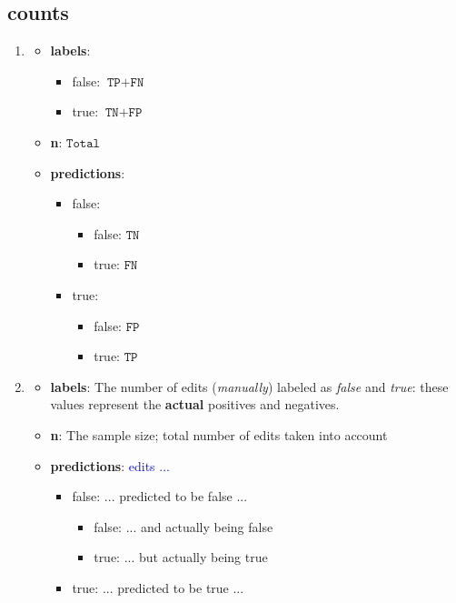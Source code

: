 \documentclass[12pt,a4paper]{article}
\begin{document}
\subsection{counts}
\begin{enumerate}
\item \begin{itemize}
\item \textbf{labels}:
\begin{itemize}
\item false: $\texttt{TP}+\texttt{FN}$
\item true: $\texttt{TN}+\texttt{FP}$
\end{itemize}
\item \textbf{n}: $\texttt{Total}$
\item \textbf{predictions}:
\begin{itemize}
\item false:
\begin{itemize}
\item false: $\texttt{TN}$
\item true: $\texttt{FN}$
\end{itemize}
\item true:
\begin{itemize}
\item false: $\texttt{FP}$
\item true: $\texttt{TP}$
\end{itemize}
\end{itemize}
\end{itemize}
\item \begin{itemize}
\item \textbf{labels}: The number of edits (\textit{manually}) labeled as \textit{false} and \textit{true}: these values represent the \textbf{actual} positives and negatives.
\item \textbf{n}: The sample size; total number of edits taken into account
\item \textbf{predictions}: \textcolor{blue}{edits ...}
\begin{itemize}
\item false: \textcolor{nRed}{... predicted to be false ...}
\begin{itemize}
\item false: \textcolor{nRed}{... and actually being false}
\item true: \textcolor{nRed}{... but actually being true}
\end{itemize}
\item true: \textcolor{pGreen}{... predicted to be true ...}

\end{itemize}
\end{itemize}
\end{enumerate}
\end{document}

